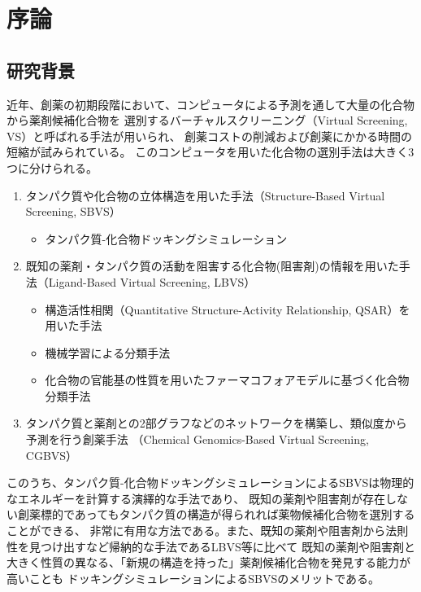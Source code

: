 \chapter{序論}
\section{研究背景}\label{sec:background}
近年、創薬の初期段階において、コンピュータによる予測を通して大量の化合物から薬剤候補化合物を
選別するバーチャルスクリーニング（Virtual Screening, VS）と呼ばれる手法が用いられ、
創薬コストの削減および創薬にかかる時間の短縮が試みられている。
このコンピュータを用いた化合物の選別手法は大きく3つに分けられる。

\begin{enumerate}
\item タンパク質や化合物の立体構造を用いた手法（Structure-Based Virtual Screening, SBVS）
	\begin{itemize}
	\item タンパク質-化合物ドッキングシミュレーション\cite{Friesner2004, Zsoldos2007, Morris2009}
	\end{itemize}
\item 既知の薬剤・タンパク質の活動を阻害する化合物(阻害剤)の情報を用いた手法（Ligand-Based Virtual Screening, LBVS）
	\begin{itemize}
	\item 構造活性相関（Quantitative Structure-Activity Relationship, QSAR）を用いた手法\cite{Hansch1964}
	\item 機械学習による分類手法\cite{Ivanciuc2007}
	\item 化合物の官能基の性質を用いたファーマコフォアモデルに基づく化合物分類手法\cite{Wolber2008}
	\end{itemize}
\item タンパク質と薬剤との2部グラフなどのネットワークを構築し、類似度から予測を行う創薬手法 
	（Chemical Genomics-Based Virtual Screening, CGBVS）\cite{Brown2012}
\end{enumerate}

このうち、タンパク質-化合物ドッキングシミュレーションによるSBVSは物理的なエネルギーを計算する演繹的な手法であり、
既知の薬剤や阻害剤が存在しない創薬標的であってもタンパク質の構造が得られれば薬物候補化合物を選別することができる、
非常に有用な方法である。また、既知の薬剤や阻害剤から法則性を見つけ出すなど帰納的な手法であるLBVS等に比べて
既知の薬剤や阻害剤と大きく性質の異なる、「新規の構造を持った」薬剤候補化合物を発見する能力が高いことも
ドッキングシミュレーションによるSBVSのメリットである。

